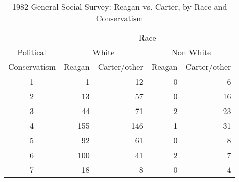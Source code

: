 \begin{table}[htb]
 \caption{1982 General Social Survey: Reagan vs. Carter, by Race and Conservatism}\label{tab:reagtab}
 \begin{center}
 \begin{tabular}{c rr rr}
  \hline
       & \multicolumn{4}{c}{Race} \\
  Political & \multicolumn{2}{c}{White} & \multicolumn{2}{c}{Non White} \\ 
  \cline{2-5}
  Conservatism & Reagan & Carter/other  & Reagan & Carter/other \\ 
  \hline
  1 & 1 & 12 & 0 & 6 \\ 
  2 & 13 & 57 & 0 & 16 \\ 
  3 & 44 & 71 & 2 & 23 \\ 
  4 & 155 & 146 & 1 & 31 \\ 
  5 & 92 & 61 & 0 & 8 \\ 
  6 & 100 & 41 & 2 & 7 \\ 
  7 & 18 & 8 & 0 & 4 \\ 
  \hline
 \end{tabular}
 \end{center}
\end{table}
